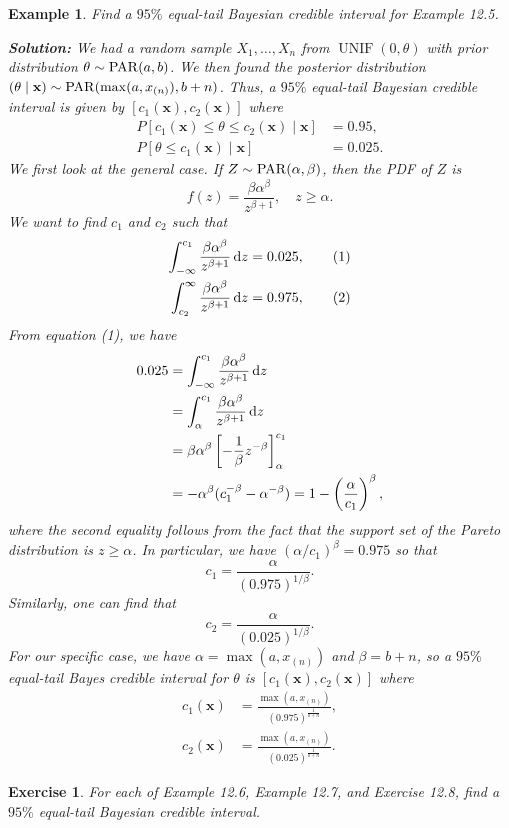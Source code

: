\documentclass[10pt]{article}
\newcommand{\dd}{\,{\rm d}}
\DeclareMathOperator{\UNIF}{UNIF}
\theoremstyle{newstyle}
\newtheorem{exercise}[thm]{Exercise}
\newtheorem{exmp}[thm]{Example}
\begin{document}
\begin{exmp}
Find a $95\%$ equal-tail Bayesian credible interval for Example 12.5. 

{\color{blue}
{\bf Solution:}
We had a random sample $X_1, \dots, X_n$ from $\UNIF(0, \theta)$ with prior distribution 
$\theta \sim {\rm PAR}(a, b)$. We then found the posterior distribution 
$(\theta \mid \mathbf x) \sim {\rm PAR}(\max(a, x_{(n)}), b+n)$. Thus, a 
$95\%$ equal-tail Bayesian credible interval is given by $[c_1(\mathbf x), c_2(\mathbf x)]$ where 
\begin{align*}
    P[c_1(\mathbf x) \leq \theta \leq c_2(\mathbf x) \mid \mathbf x] &= 0.95, \\
    P[\theta \leq c_1(\mathbf x) \mid \mathbf x] &= 0.025. 
\end{align*}
We first look at the general case. If $Z \sim {\rm PAR}(\alpha, \beta)$, then the PDF of $Z$ is 
\[ f(z) = \frac{\beta\alpha^\beta}{z^{\beta+1}}, \quad z \geq \alpha. \]
We want to find $c_1$ and $c_2$ such that 
\begin{align*}
    \int_{-\infty}^{c_1} \frac{\beta\alpha^\beta}{z^{\beta+1}}\dd z &= 0.025, \tag{1} \\
    \int_{c_2}^{\infty} \frac{\beta\alpha^\beta}{z^{\beta+1}}\dd z &= 0.975, \tag{2}
\end{align*}
From equation (1), we have 
\begin{align*}
0.025 &= \int_{-\infty}^{c_1} \frac{\beta\alpha^\beta}{z^{\beta+1}}\dd z \\
&= \int_{\alpha}^{c_1} \frac{\beta\alpha^\beta}{z^{\beta+1}}\dd z \\
&= \beta\alpha^\beta \left[ -\frac1\beta z^{-\beta} \right]_\alpha^{c_1} \\
&= -\alpha^\beta (c_1^{-\beta} - \alpha^{-\beta}) = 1 - \left( \frac\alpha{c_1} \right)^\beta, 
\end{align*}
where the second equality follows from the fact that the support set 
of the Pareto distribution is $z \geq \alpha$. 
In particular, we have $(\alpha/c_1)^\beta = 0.975$ so that 
\[ c_1 = \frac{\alpha}{(0.975)^{1/\beta}}. \]
Similarly, one can find that 
\[ c_2 = \frac{\alpha}{(0.025)^{1/\beta}}. \]
For our specific case, we have $\alpha = \max(a, x_{(n)})$ and $\beta = b+n$, so a 
$95\%$ equal-tail Bayes credible interval for $\theta$ is $[c_1(\mathbf x), c_2(\mathbf x)]$ where 
\begin{align*}
    c_1(\mathbf x) &= \frac{\max(a, x_{(n)})}{(0.975)^{\frac{1}{b+n}}}, \\ 
    c_2(\mathbf x) &= \frac{\max(a, x_{(n)})}{(0.025)^{\frac{1}{b+n}}}.
\end{align*}}
\end{exmp}

\begin{exercise}
For each of Example 12.6, Example 12.7, and Exercise 12.8, find
a $95\%$ equal-tail Bayesian credible interval.
\end{exercise}
\end{document}
